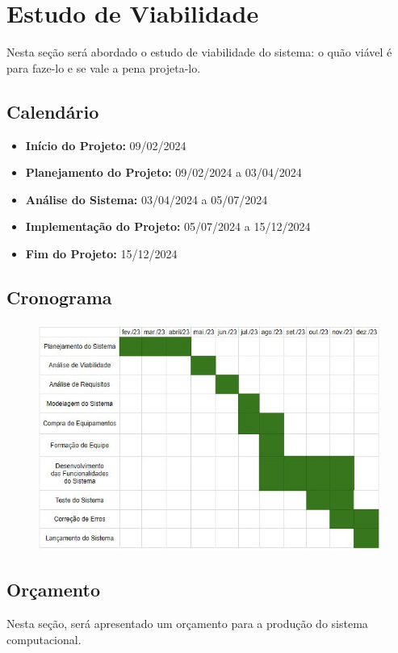 \section{Estudo de Viabilidade}
	Nesta seção será abordado o estudo de viabilidade do sistema: o quão viável é para faze-lo e se vale a pena projeta-lo.

       \subsection{Calend\'{a}rio }
		\begin{itemize}
			\item \textbf{Início do Projeto:} 09/02/2024
			
			\item \textbf{Planejamento do Projeto:} 09/02/2024 a 03/04/2024
			
			\item \textbf{Análise do Sistema:} 03/04/2024 a 05/07/2024
			
			\item \textbf{Implementação do Projeto:} 05/07/2024 a 15/12/2024
			
			\item \textbf{Fim do Projeto:} 15/12/2024 
		\end{itemize}
       \subsection{Cronograma }
\begin{figure}[H]
	\centering
	\includegraphics[width=0.8\linewidth]{Pictures/Cronograma}
	\caption{}
	\label{fig:cronograma}
\end{figure}

       \subsection{Or\c{c}amento }
       Nesta seção, será apresentado um orçamento para a produção do sistema computacional.

